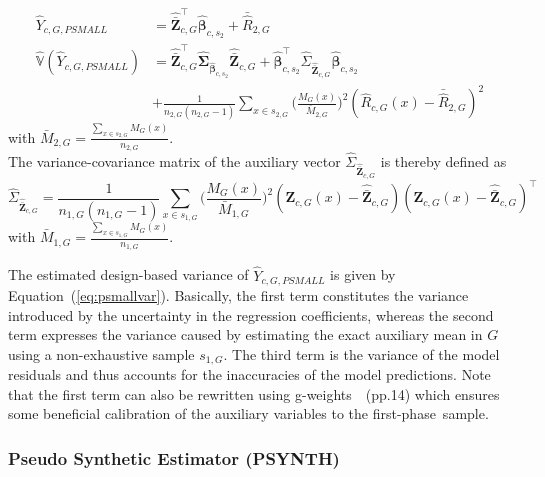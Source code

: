 \documentclass[remotesensing,article,accept,moreauthors,pdftex,10pt,a4paper]{Definitions/mdpi}
\newcommand{\psynth}{PSYNTH}
\newcommand{\var}{\mathbb{V}}
\begin{document}
\begin{subequations}\label{eq:psmall}
	\begin{align}
	\hat{Y}_{c,G,PSMALL} & =  \hat{\bar{\pmb{Z}}}_{c,G}^{\top}\hat{\pmb{\beta}}_{c,s_2} + \bar{\hat{R}}_{2,G} \label{eq:psmall_pest} \\
	\hat{\var}(\hat{Y}_{c,G,PSMALL}) &  =  \hat{\bar{\pmb{Z}}}_{c,G}^{\top}\hat{\pmb{\Sigma}}_{\hat{\pmb{\beta}}_{c,s_2}}\hat{\bar{\pmb{Z}}}_{c,G}
	+ \hat{\pmb{\beta}}_{c,s_2}^{\top}\hat{\Sigma}_{\hat{\bar{\pmb{Z}}}_{c,G}}\hat{\pmb{\beta}}_{c,s_2} \nonumber \\
	& + \frac{1}{n_{2,G}(n_{2,G}-1)}\sum_{x \in s_{2,G}}\Big(\frac{M_{G}(x)}{\bar{M}_{2,G}}\Big)^2(\hat{R}_{c,G}(x) - \bar{\hat{R}}_{2,G})^2
	\label{eq:psmallvar}
	\end{align}
\end{subequations}
with $\bar{M}_{2,G} = \frac{\sum_{x \in s_{2,G}}M_{G}(x)}{n_{2,G}}$.\\

The variance-covariance matrix of the auxiliary vector $\hat{\Sigma}_{\hat{\bar{\pmb{Z}}}_{c,G}}$ is thereby defined as
\begin{equation}\label{estvarcovaux_G}
\hat{\Sigma}_{\hat{\bar{\pmb{Z}}}_{c,G}}  =  \frac{1}{n_{1,G}(n_{1,G}-1)} \sum_{x \in s_{1,G}} \big(\frac{M_{G}(x)}{\bar{M}_{1,G}}\big)^2 (\pmb{Z}_{c,G}(x)-\hat{\bar{\pmb{Z}}}_{c,G})(\pmb{Z}_{c,G}(x)-\hat{\bar{\pmb{Z}}}_{c,G})^{\top}
\end{equation}
with $\bar{M}_{1,G} = \frac{\sum_{x \in s_{1,G}}M_{G}(x)}{n_{1,G}}$.

The estimated design-based variance of $ \hat{Y}_{c,G,PSMALL}$ is given by Equation~(\ref{eq:psmallvar}). Basically, the first term constitutes the variance introduced by the uncertainty in the regression coefficients, whereas the second term expresses the variance caused by estimating the exact auxiliary mean in $G$ using a non-exhaustive sample $s_{1,G}$. The third term is the variance of the model residuals and thus accounts for the inaccuracies of the model predictions. Note that the first term can also be rewritten using g-weights~\cite{mandallaz2016}~(pp.14) which ensures some beneficial calibration of the auxiliary variables to the first-phase~sample.


\subsubsection{Pseudo Synthetic Estimator (\psynth{})}
\label{sec:psynth}
\end{document}
